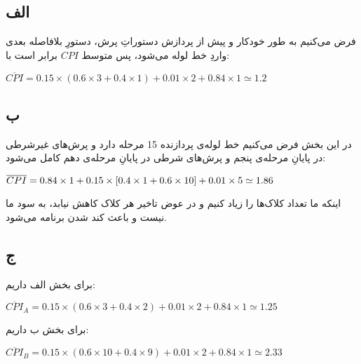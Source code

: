 \subsection*{الف}
فرض می‌کنیم به طور
خودکار و پیش از پردازش دستوراتِ پرش، دستورِ بلافاصله بعدی واردِ خط لوله می‌شود، پس متوسط $CPI$ برابر است با:

\setLTR
$
\overline{CPI} = 0.15\times(0.6\times3+0.4\times1) + 0.01\times2 +0.84\times1 \simeq 1.2
$
\setRTL

\subsection*{ب}
در این بخش فرض می‌کنیم خط لوله‌ی پردازنده 15 مرحله دارد و پرش‌های غیرشرطی در پایانِ مرحله‌ی پنجم و پرش‌های شرطی در پایانِ
مرحله‌ی دهم کامل می‌شود:

\setLTR
$
\overline{CPI} = 0.84\times1  + 0.15\times[0.4\times1+0.6\times10] + 0.01\times5 \simeq 1.86 \\ \\
$
\setRTL

اینکه ما تعداد کلاک‌ها را زیاد کنیم و در عوض تاخیر هر کلاک کاهش نیابد، به سود ما نیست و باعث کند شدن برنامه می‌شود.

\subsection*{ج}

برای بخش الف داریم:

\setLTR
$
\overline{CPI}_A = 0.15\times(0.6\times3+0.4\times2) + 0.01\times2 +0.84\times1 \simeq 1.25
$
\setRTL


برای بخش ب داریم:

\setLTR
$
\overline{CPI}_B = 0.15\times(0.6\times10+0.4\times9) + 0.01\times2 +0.84\times1 \simeq 2.33
$
\setRTL






